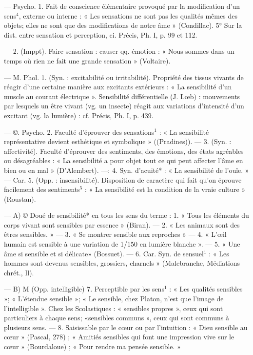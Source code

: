 \begin{itemize}[leftmargin=1cm, label=, itemsep=1pt]
 — Psycho. 1. Fait de
conscience élémentaire provoqué par
la modification d'un sens$^4$, externe
ou interne : « Les sensations ne sont
pas les qualités mêmes des objets;
elles ne sont que des modifications
de notre âme » (Condillac). 5° Sur
la dist. entre sensation et perception,
ci. Précis, Ph. I, p. 99 et 112.

— 2. (Imppt). Faire sensation :
causer qq. émotion : « Nous sommes
dans un temps où rien ne fait une
grande sensation » (Voltaire).

 — M. Phol. 1. (Syn. : excitabilité ou irritabilité). Propriété des
tissus vivants de réagir d’une certaine manière aux excitants extérieurs : « La sensibilité d’un muscle
au courant électrique ». Sensibilité
différentielle (J. Lœb) : mouvements
par lesquels un être vivant (vg. un
insecte) réagit aux variations d'intensité d’un excitant (vg. la lumière) : cf. Précis, Ph. I, p. 439.

— ©. Psycho. 2. Faculté d’éprouver
des sensations$^1$ : « La sensibilité
représentative devient esthétique et
symbolique » ((Pradines)). — 3. (Syn. :
affectivité). Faculté d’éprouver des
sentiments, des émotions, des états
agréables ou désagréables : « La
sensibilité a pour objet tout ce qui
peut affecter l’âme en bien ou en
mal » (D'Alembert). —: 4. Syn.
d'acuité* : « La sensibilité de l’ouîe. »
— Car. 5. (Opp. : insensibilité).
Disposition de caractère qui fait
qu’on éprouve facilement des sentiments$^5$ : « La sensibilité est la condition de la vraie culture » (Roustan).

 — A) © Doué de sensibilité*
en tous les sens du terme : 1. « Tous
les éléments du corps vivant sont
sensibles par essence » (Biran). —
2. « Les animaux sont des êtres sensibles. » — 3. « Se montrer sensible
aux reproches » — 4. « L’œil
humain est sensible à une variation
de 1/150 en lumière blanche ». —
5. « Une âme si sensible et si délicate»
(Bossuet). — 6. Car. Syn. de sensuel$^1$ : « Les hommes sont devenus
sensibles, grossiers, charnels » (Malebranche, Médiations chrét., Il).

— B) M (Opp. intelligible)
7. Perceptible par les sens$^1$ : « Les
qualités sensibles »; « L’étendue sensible »; « Le sensible, chez Platon,
n’est que l’image de l'intelligible ».
Chez les Scolastiques : « sensibles
propres », ceux qui sont particuliers
à chaque sens; «sensibles communs »,
ceux qui sont communs à plusieurs
sens. — 8. Saisissable par le cœur
ou par l'intuition : « Dieu sensible
au cœur » (Pascal, 278) ; « Amitiés
sensibles qui font une impression
vive sur le cœur » (Bourdaloue) ;
« Pour rendre ma pensée sensible. »


\end{itemize}
